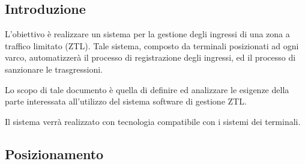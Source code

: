 \documentclass[12pt, letterpaper]{article}
\begin{document}
\subsection{Introduzione}
L'obiettivo è realizzare un sistema per la gestione degli ingressi di una zona a traffico limitato (ZTL). Tale sistema, composto da terminali posizionati ad ogni varco, automatizzerà il processo di registrazione degli ingressi, ed il processo di sanzionare le trasgressioni.

\noindent
Lo scopo di tale documento è quella di definire ed analizzare le esigenze della parte interessata all'utilizzo del sistema software di gestione ZTL.

\noindent
Il sistema verrà realizzato con tecnologia compatibile con i sistemi dei terminali.

\subsection{Posizionamento}
\end{document}
